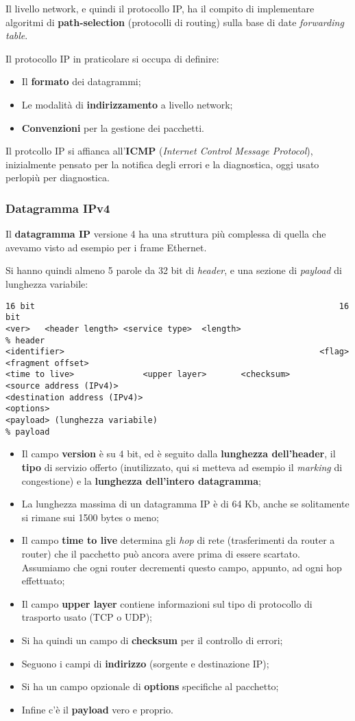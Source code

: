 \documentclass[a4paper,11pt]{article}
\begin{document}
Il livello network, e quindi il protocollo IP, ha il compito di implementare algoritmi di \textbf{path-selection} (protocolli di routing) sulla base di date \textit{forwarding table}.

Il protocollo IP in praticolare si occupa di definire:
\begin{itemize}
	\item Il \textbf{formato} dei datagrammi;
	\item Le modalità di \textbf{indirizzamento} a livello network;
	\item \textbf{Convenzioni} per la gestione dei pacchetti.
\end{itemize}

Il protcollo IP si affianca all'\textbf{ICMP} (\textit{Internet Control Message Protocol}), inizialmente pensato per la notifica degli errori e la diagnostica, oggi usato perlopiù per diagnostica.

\subsubsection{Datagramma IPv4}
Il \textbf{datagramma IP} versione 4 ha una struttura più complessa di quella che avevamo visto ad esempio per i frame Ethernet.

Si hanno quindi almeno 5 parole da 32 bit di \textit{header}, e una sezione di \textit{payload} di lunghezza variabile: 
\begin{lstlisting}[style=codestyle]	
16 bit																16 bit
<ver>	<header length>	<service type>	<length>									% header
<identifier>													<flag>	<fragment offset>
<time to live>				<upper layer>		<checksum>
<source address (IPv4)>
<destination address (IPv4)>
<options>
<payload> (lunghezza variabile)																	% payload
\end{lstlisting}

\begin{itemize}
	\item Il campo \textbf{version} è su 4 bit, ed è seguito dalla \textbf{lunghezza dell'header}, il \textbf{tipo} di servizio offerto (inutilizzato, qui si metteva ad esempio il \textit{marking} di congestione) e la \textbf{lunghezza dell'intero datagramma};
	\item La lunghezza massima di un datagramma IP è di 64 Kb, anche se solitamente si rimane sui 1500 bytes o meno;
	\item Il campo \textbf{time to live} determina gli \textit{hop} di rete (trasferimenti da router a router) che il pacchetto può ancora avere prima di essere scartato. Assumiamo che ogni router decrementi questo campo, appunto, ad ogni hop effettuato;
	\item Il campo \textbf{upper layer} contiene informazioni sul tipo di protocollo di trasporto usato (TCP o UDP);
	\item Si ha quindi un campo di \textbf{checksum} per il controllo di errori;
	\item Seguono i campi di \textbf{indirizzo} (sorgente e destinazione IP);
	\item Si ha un campo opzionale di \textbf{options} specifiche al pacchetto;
	\item Infine c'è il \textbf{payload} vero e proprio.
\end{itemize}
\end{document}

